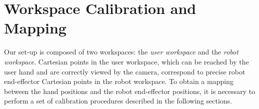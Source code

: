 \documentclass[letterpaper, 10 pt, conference]{ieeeconf}  %
\begin{document}
\section{Workspace Calibration and Mapping} \label{sec:calib}


Our set-up is composed of two workspaces: the \textit{user workspace} and the \textit{robot workspace}. Cartesian points in the user workspace, which can be reached by the user hand and are correctly viewed by the camera, correspond to precise robot end-effector Cartesian points in the robot workspace. To obtain a mapping between the hand positions and the robot end-effector positions, it is necessary to perform a set of calibration procedures described in the following sections.
\end{document}
